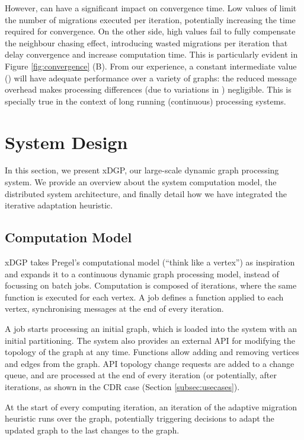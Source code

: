 \documentclass{sig-alternate-10pt}
\begin{document}
However,  can have a significant impact on convergence time. Low values of  limit the number of migrations executed per iteration, potentially increasing the time required for convergence. On the other side, high values fail to fully compensate the neighbour chasing effect, introducing wasted migrations per iteration that delay convergence and increase computation time. This is particularly evident in Figure \ref{fig:convergence} (B). From our experience, a constant intermediate value () will have adequate performance over a variety of graphs: the reduced message overhead makes processing differences (due to variations in ) negligible. This is specially true in the context of long running (continuous) processing systems.


\section{System Design}
\label{sec:lsid}

In this section, we present xDGP, our large-scale dynamic graph processing system. We provide an overview about the system computation model, the distributed system architecture, and finally detail how we have integrated the iterative adaptation heuristic.

\subsection{Computation Model} 

xDGP takes Pregel's computational model (``think like a vertex'') as inspiration and expands it to a continuous dynamic graph processing model, instead of focussing on batch jobs. Computation is composed of iterations, where the same function is executed for each vertex. A job defines a function applied to each vertex, synchronising messages at the end of every iteration. 

A job starts processing an initial graph, which is loaded into the system with an initial partitioning. The system also provides an external API for modifying the topology of the graph at any time. Functions allow adding and removing vertices and edges from the graph. API topology change requests are added to a change queue, and are processed at the end of every iteration (or potentially, after  iterations, as shown in the CDR case (Section \ref{subsec:usecases}). 

At the start of every computing iteration, an iteration of the  adaptive migration heuristic runs over the graph, potentially triggering decisions to adapt the updated graph to the last changes to the graph. 
\end{document}
